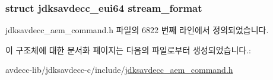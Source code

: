 \subsubsection[{\texorpdfstring{stream\+\_\+format}{stream_format}}]{\setlength{\rightskip}{0pt plus 5cm}struct {\bf jdksavdecc\+\_\+eui64} stream\+\_\+format}\hypertarget{structjdksavdecc__aem__command__set__stream__format__response_a77359be54ea386b1da66597746709ed0}{}\label{structjdksavdecc__aem__command__set__stream__format__response_a77359be54ea386b1da66597746709ed0}


jdksavdecc\+\_\+aem\+\_\+command.\+h 파일의 6822 번째 라인에서 정의되었습니다.



이 구조체에 대한 문서화 페이지는 다음의 파일로부터 생성되었습니다.\+:\begin{DoxyCompactItemize}
\item 
avdecc-\/lib/jdksavdecc-\/c/include/\hyperlink{jdksavdecc__aem__command_8h}{jdksavdecc\+\_\+aem\+\_\+command.\+h}\end{DoxyCompactItemize}

